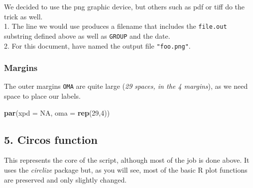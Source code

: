 \documentclass[
]{article}
\newenvironment{Shaded}{\begin{snugshade}}{\end{snugshade}}
\newcommand{\CommentTok}[1]{\textcolor[rgb]{0.56,0.35,0.01}{\textit{#1}}}
\newcommand{\DataTypeTok}[1]{\textcolor[rgb]{0.13,0.29,0.53}{#1}}
\newcommand{\DecValTok}[1]{\textcolor[rgb]{0.00,0.00,0.81}{#1}}
\newcommand{\KeywordTok}[1]{\textcolor[rgb]{0.13,0.29,0.53}{\textbf{#1}}}
\newcommand{\NormalTok}[1]{#1}
\newcommand{\OtherTok}[1]{\textcolor[rgb]{0.56,0.35,0.01}{#1}}
\newcommand{\StringTok}[1]{\textcolor[rgb]{0.31,0.60,0.02}{#1}}
\begin{document}
We decided to use the png graphic device, but others such as pdf or tiff
do the trick as well.\\
1. The line we would use produces a filename that includes the
\texttt{file.out} substring defined above as well as \texttt{GROUP} and
the date.\\
2. For this document, have named the output file \texttt{"foo.png"}.

\begin{Shaded}
\end{Shaded}

\hypertarget{margins}{%
\subsubsection{Margins}\label{margins}}

The outer margins \texttt{OMA} are quite large (\emph{29 spaces, in the
4 margins}), as we need space to place our labels.

\begin{Shaded}
\begin{Highlighting}[]
\KeywordTok{par}\NormalTok{(}\DataTypeTok{xpd =} \OtherTok{NA}\NormalTok{, }\DataTypeTok{oma =} \KeywordTok{rep}\NormalTok{(}\DecValTok{29}\NormalTok{,}\DecValTok{4}\NormalTok{))}
\end{Highlighting}
\end{Shaded}

\hypertarget{circos-function}{%
\subsection{5. Circos function}\label{circos-function}}

This represents the core of the script, although most of the job is done
above. It uses the \emph{circlize} package but, as you will see, most of
the basic R plot functions are preserved and only slightly changed.
\end{document}
